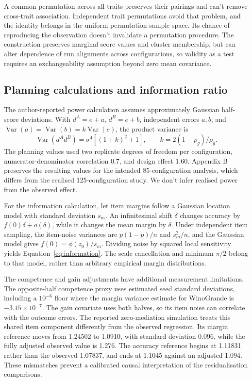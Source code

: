 A common permutation across all traits preserves their pairings and can't remove cross-trait association. Independent trait permutations avoid that problem, and the identity belongs in the uniform permutation sample space. Its chance of reproducing the observation doesn't invalidate a permutation procedure. The construction preserves marginal score values and cluster membership, but can alter dependence of run alignments across configurations, so validity as a test requires an exchangeability assumption beyond zero mean covariance.

\subsection{Planning calculations and information ratio}
The author-reported power calculation assumes approximately Gaussian half-score deviations. With $d^A=e+a$, $d^B=e+b$, independent errors $a,b$, and $\operatorname{Var}(a)=\operatorname{Var}(b)=k\operatorname{Var}(e)$, the product variance is
\begin{equation}
\operatorname{Var}(d^Ad^B)=\sigma^4[(1+k)^2+1],\qquad
k=2(1-\rho_g)/\rho_g.
\end{equation}
The planning values used two replicate degrees of freedom per configuration, numerator-denominator correlation 0.7, and design effect 1.60. Appendix B preserves the resulting values for the intended 85-configuration analysis, which differs from the realised 125-configuration study. We don't infer realised power from the observed effect.

For the information calculation, let item margins follow a Gaussian location model with standard deviation $s_m$. An infinitesimal shift $\delta$ changes accuracy by $f(0)\delta+o(\delta)$, while it changes the mean margin by $\delta$. Under independent item sampling, the item-noise variances are $p(1-p)/n$ and $s_m^2/n$, and the Gaussian model gives $f(0)=\phi(z_0)/s_m$. Dividing noise by squared local sensitivity yields Equation~\ref{eq:information}. The scale cancellation and minimum $\pi/2$ belong to that model, rather than arbitrary empirical margin distributions.

The competence and gain adjustments have additional measurement limitations. The opposite-half competence proxy uses estimated seed standard deviations, including a $10^{-6}$ floor where the margin variance estimate for WinoGrande is $-3.15\times10^{-7}$. The gain covariate uses both halves, so its item noise can correlate with the outcome errors. The reported zero-mediation simulation treats this shared item component differently from the observed regression. Its margin reference moves from 1.24502 to 1.0910, with standard deviation 0.096, while the fully adjusted observed value is 1.276. The accuracy reference begins at 1.11831 rather than the observed 1.07837, and ends at 1.1045 against an adjusted 1.094. These mismatches prevent a calibrated causal interpretation of the residualisation comparisons.
